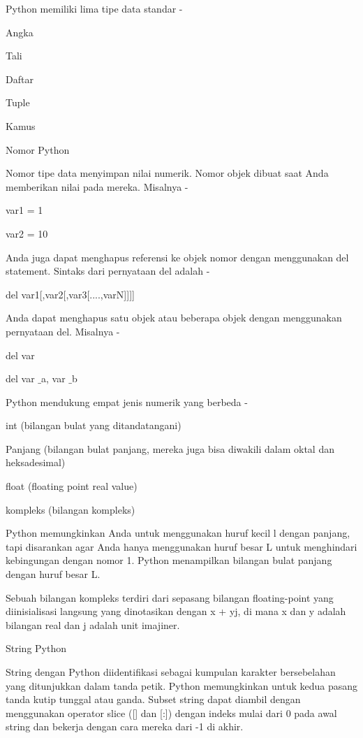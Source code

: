\noindent 
Python memiliki lima tipe data standar - \par
\noindent 
Angka \par
\noindent 
Tali \par
\noindent 
Daftar \par
\noindent 
Tuple \par
\noindent 
Kamus \par
\noindent 
Nomor Python \par
\noindent 
Nomor tipe data menyimpan nilai numerik. $  $Nomor objek dibuat saat Anda memberikan nilai pada mereka. $  $Misalnya - \par
\noindent 
var1 = 1 \par
\noindent 
var2 = 10 \par
\noindent 
Anda juga dapat menghapus referensi ke objek nomor dengan menggunakan del statement. $  $Sintaks dari pernyataan del adalah - \par
\noindent 
del var1[,var2[,var3[....,varN]]]] \par
\noindent 
Anda dapat menghapus satu objek atau beberapa objek dengan menggunakan pernyataan del. $  $Misalnya - \par
\noindent 
del var \par
\noindent 
del var $  \_  $a, var $  \_  $b \par
\noindent 
Python mendukung empat jenis numerik yang berbeda - \par
\noindent 
int (bilangan bulat yang ditandatangani) \par
\noindent 
Panjang (bilangan bulat panjang, mereka juga bisa diwakili dalam oktal dan heksadesimal) \par
\noindent 
float (floating point real value) \par
\noindent 
kompleks (bilangan kompleks) \par
\noindent 
Python memungkinkan Anda untuk menggunakan huruf kecil l dengan panjang, tapi disarankan agar Anda hanya menggunakan huruf besar L untuk menghindari kebingungan dengan nomor 1. Python menampilkan bilangan bulat panjang dengan huruf besar L. \par
\noindent 
Sebuah bilangan kompleks terdiri dari sepasang bilangan floating-point yang diinisialisasi langsung yang dinotasikan dengan x + yj, di mana x dan y adalah bilangan real dan j adalah unit imajiner. \par
\noindent 
String Python \par
\noindent 
String dengan Python diidentifikasi sebagai kumpulan karakter bersebelahan yang ditunjukkan dalam tanda petik. $  $Python memungkinkan untuk kedua pasang tanda kutip tunggal atau ganda. $  $Subset string dapat diambil dengan menggunakan operator slice ([] dan [:]) dengan indeks mulai dari 0 pada awal string dan bekerja dengan cara mereka dari -1 di akhir. \par
